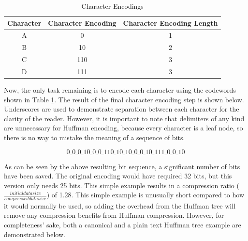 \documentclass[doublespace,nopageskip]{VTthesis}
\begin{document}
\begin{table}[htb]
	\centering
	\caption{Character Encodings}
	\begin{tabular}{ccc}
	    \toprule
	    Character & Character Encoding & Character Encoding Length\\
	    \midrule
	    A & 0 & 1\\
	    \midrule
	    B & 10 & 2\\
	    \midrule
	    C & 110 & 3\\
	    \midrule
	    D & 111 & 3\\
	    \bottomrule
	\end{tabular}
	\label{tab:huffman_encodings}
\end{table}

Now, the only task remaining is to encode each character using the codewords shown in Table \ref{tab:huffman_encodings}. The result of the final character encoding step is shown below. Underscores are used to demonstrate separation between each character for the clarity of the reader. However, it is important to note that delimiters of any kind are unnecessary for Huffman encoding, because every character is a leaf node, so there is no way to mistake the meaning of a sequence of bits.

\[0\_0\_0\_10\_0\_0\_110\_10\_10\_0\_0\_10\_111\_0\_0\_10\]

As can be seen by the above resulting bit sequence, a significant number of bits have been saved. The original encoding would have required 32 bits, but this version only needs 25 bits. This simple example results in a compression ratio ($\frac{initial data size}{compressed data size}$) of 1.28. This simple example is unusually short compared to how it would normally be used, so adding the overhead from the Huffman tree will remove any compression benefits from Huffman compression. However, for completeness' sake, both a canonical and a plain text Huffman tree example are demonstrated below.
\end{document}
